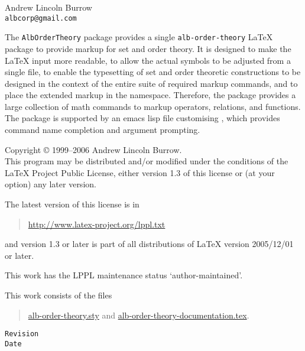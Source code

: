 \documentclass[11pt,a4paper,oneside]{alb-corp}
\begin{document}


\begin{albTitlePage}


  Andrew Lincoln Burrow\\
  \texttt{albcorp@gmail.com}



  The \texttt{AlbOrderTheory} package provides a single
  \texttt{alb-order-theory} \LaTeX{} package to provide markup for set
  and order theory.  It is designed to make the \LaTeX{} input more
  readable, to allow the actual symbols to be adjusted from a single
  file, to enable the typesetting of set and order theoretic
  constructions to be designed in the context of the entire suite of
  required markup commands, and to place the extended markup in the
  \albLogo{} namespace.  Therefore, the package provides a large
  collection of math commands to markup operators, relations, and
  functions.  The package is supported by an emacs lisp file customising
  \AUCTeX{}, which provides command name completion and argument
  prompting.



  Copyright \copyright{} 1999--2006 Andrew Lincoln Burrow.\\
  This program may be distributed and/or modified under the conditions
  of the \LaTeX{} Project Public License, either version 1.3 of this
  license or (at your option) any later version.

  \medskip{}

  The latest version of this license is in
  \begin{quote}
    \url{http://www.latex-project.org/lppl.txt}
  \end{quote}
  and version 1.3 or later is part of all distributions of LaTeX version
  2005/12/01 or later.

  \medskip{}

  This work has the LPPL maintenance status `author-maintained'.

  \medskip{}

  This work consists of the files
  \begin{quote}
    \begin{flushleft}
      \url{alb-order-theory.sty} and
      \url{alb-order-theory-documentation.tex}.
    \end{flushleft}
  \end{quote}



  \verb$Revision$\\
  \verb$Date$

\end{albTitlePage}
\end{document}
